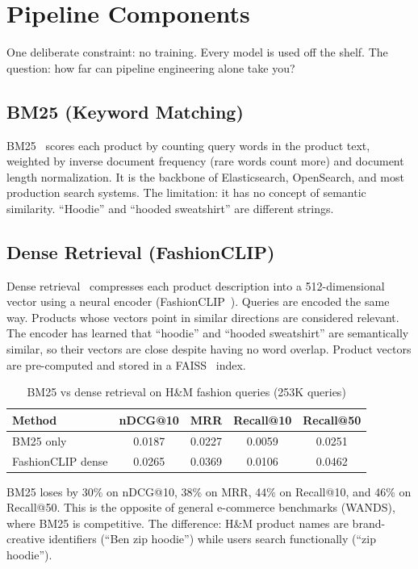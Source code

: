 \documentclass[11pt,a4paper]{article}
\begin{document}
\section{Pipeline Components}

One deliberate constraint: no training. Every model is used off the shelf. The question: how far can pipeline engineering alone take you?

\subsection{BM25 (Keyword Matching)}

BM25~\cite{bm25} scores each product by counting query words in the product text, weighted by inverse document frequency (rare words count more) and document length normalization. It is the backbone of Elasticsearch, OpenSearch, and most production search systems. The limitation: it has no concept of semantic similarity. ``Hoodie'' and ``hooded sweatshirt'' are different strings.

\subsection{Dense Retrieval (FashionCLIP)}

Dense retrieval~\cite{dense-retrieval} compresses each product description into a 512-dimensional vector using a neural encoder (FashionCLIP~\cite{marqo-fashionclip}). Queries are encoded the same way. Products whose vectors point in similar directions are considered relevant. The encoder has learned that ``hoodie'' and ``hooded sweatshirt'' are semantically similar, so their vectors are close despite having no word overlap. Product vectors are pre-computed and stored in a FAISS~\cite{faiss} index.

\begin{table}[h]
\centering
\caption{BM25 vs dense retrieval on H\&M fashion queries (253K queries)}
\begin{tabular}{lcccc}
\toprule
\textbf{Method} & \textbf{nDCG@10} & \textbf{MRR} & \textbf{Recall@10} & \textbf{Recall@50} \\
\midrule
BM25 only & 0.0187 & 0.0227 & 0.0059 & 0.0251 \\
FashionCLIP dense & 0.0265 & 0.0369 & 0.0106 & 0.0462 \\
\bottomrule
\end{tabular}
\end{table}

BM25 loses by 30\% on nDCG@10, 38\% on MRR, 44\% on Recall@10, and 46\% on Recall@50. This is the opposite of general e-commerce benchmarks (WANDS), where BM25 is competitive. The difference: H\&M product names are brand-creative identifiers (``Ben zip hoodie'') while users search functionally (``zip hoodie'').
\end{document}
